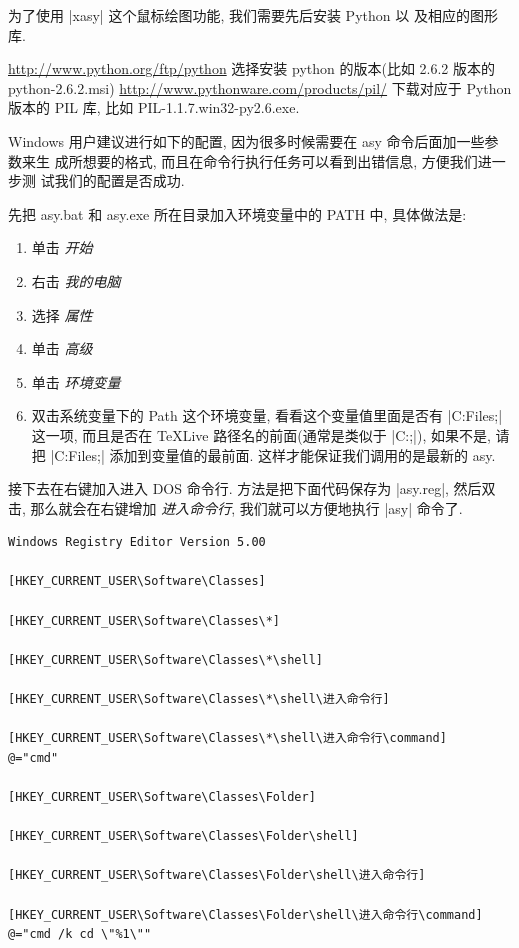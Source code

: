 \documentclass[nofonts,CJKnormalspaces]{ctexbook}
\begin{document}
为了使用 |xasy| 这个鼠标绘图功能, 我们需要先后安装 Python 以
及相应的图形库.

\url{http://www.python.org/ftp/python} 选择安装 python 的版本(比如
2.6.2 版本的 python-2.6.2.msi)
\url{http://www.pythonware.com/products/pil/} 下载对应于 Python 版本的
PIL 库, 比如 PIL-1.1.7.win32-py2.6.exe.

Windows 用户建议进行如下的配置, 因为很多时候需要在 asy 命令后面加一些参数来生
成所想要的格式, 而且在命令行执行任务可以看到出错信息, 方便我们进一步测
试我们的配置是否成功.

先把 asy.bat 和 asy.exe 所在目录加入环境变量中的 PATH 中, 具体做法是:
\begin{enumerate}
\item  单击 \emph{开始}
\item 右击 \emph{我的电脑}
\item 选择 \emph{属性}
\item 单击 \emph{高级}
\item 单击 \emph{环境变量}
\item 双击系统变量下的 Path 这个环境变量, 看看这个变量值里面是否有
 |C:\Program  Files\Asymptote;|
 这一项, 而且是否在 TeXLive 路径名的前面(通常是类似于
 |C:\texlive{}\bin{};|),
 如果不是, 请把
|C:\Program Files\Asymptote;|
 添加到变量值的最前面. 这样才能保证我们调用的是最新的 asy.
\end{enumerate}

接下去在右键加入进入 DOS 命令行.
\label{Windows:DOS}
方法是把下面代码保存为 |asy.reg|, 然后双击, 那么就会在右键增加
\emph{进入命令行}, 我们就可以方便地执行 |asy| 命令了.
\begin{verbatim}
Windows Registry Editor Version 5.00

[HKEY_CURRENT_USER\Software\Classes]

[HKEY_CURRENT_USER\Software\Classes\*]

[HKEY_CURRENT_USER\Software\Classes\*\shell]

[HKEY_CURRENT_USER\Software\Classes\*\shell\进入命令行]

[HKEY_CURRENT_USER\Software\Classes\*\shell\进入命令行\command]
@="cmd"

[HKEY_CURRENT_USER\Software\Classes\Folder]

[HKEY_CURRENT_USER\Software\Classes\Folder\shell]

[HKEY_CURRENT_USER\Software\Classes\Folder\shell\进入命令行]

[HKEY_CURRENT_USER\Software\Classes\Folder\shell\进入命令行\command]
@="cmd /k cd \"%1\""
\end{verbatim}
\end{document}
